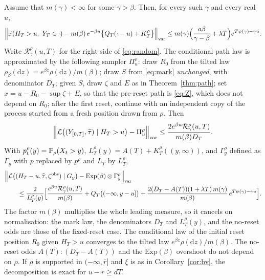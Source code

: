 \documentclass[11pt,a4paper]{article}
\begin{document}
\begin{theorem}\label{thm:random}
Assume that $m(\gamma)<\infty$ for some $\gamma>\beta$. Then, for every such $\gamma$ and every real $u$,
\begin{equation}\label{eq:random}
 \Big\|\mathbb P(H_T>u,\ Y_T\in\cdot)-m(\beta)\,e^{-\beta u}\big\{Q_T(\cdot-u)+K^\rho_T\big\}\Big\|_{\mathrm{var}}\le m(\gamma)\Big(\frac{a\beta}{\gamma-\beta}+\lambda T\Big)e^{T\psi(\gamma)-\gamma u}.
\end{equation}
Write $\mathcal R^\rho_\gamma(u,T)$ for the right side of \eqref{eq:random}. The conditional path law is approximated by the following sampler $\Pi^\rho_u$: draw $R_0$ from the tilted law $\rho_\beta(\mathrm dz)=e^{\beta z}\rho(\mathrm dz)/m(\beta)$; draw $S$ from \eqref{eq:mark} \emph{unchanged}, with denominator $D_T$; given $S$, draw $\zeta$ and $E$ as in Theorem~\ref{thm:path}; set $x=u-R_0-\sup\zeta+E$, so that the pre-reset path is \eqref{eq:Z}, which does not depend on $R_0$; after the first reset, continue with an independent copy of the process started from a fresh position drawn from $\rho$. Then
\begin{equation}\label{eq:randompath}
 \Big\|\mathcal L\big((Y_{[0,T]},\widehat\tau)\mid H_T>u\big)-\Pi^\rho_u\Big\|_{\mathrm{var}}\le\frac{2e^{\beta u}\mathcal R^\rho_\gamma(u,T)}{m(\beta)D_T}.
\end{equation}
With $p^\rho_t(y)=\mathbb P_\rho(X_t>y)$, $L^\rho_T(y)=A(T)+K^\rho_T((y,\infty))$, and $\Gamma^\rho_y$ defined as $\Gamma_y$ with $p$ replaced by $p^\rho$ and $L_T$ by $L^\rho_T$,
\begin{equation}\label{eq:randommarks}
 \begin{split}
 &\Big\|\mathcal L\big((H_T-u,\widehat\tau,\zeta^{\rm obs})\mid G_y\big)-\mathrm{Exp}(\beta)\otimes\Gamma^\rho_y\Big\|_{\mathrm{var}}\\
 &\qquad\le\frac{2}{L^\rho_T(y)}\Big[\frac{e^{\beta u}\mathcal R^\rho_\gamma(u,T)}{m(\beta)}+Q_T\big((-\infty,y-u]\big)+\frac{2(D_T-A(T))(1+\lambda T)\,m(\gamma)}{m(\beta)}\,e^{T\psi(\gamma)-\gamma u}\Big].
 \end{split}
\end{equation}
The factor $m(\beta)$ multiplies the whole leading measure, so it cancels on normalisation: the mark law, the denominators $D_T$ and $L^\rho_T(y)$, and the no-reset odds are those of the fixed-reset case. The conditional law of the initial reset position $R_0$ given $H_T>u$ converges to the tilted law $e^{\beta z}\rho(\mathrm dz)/m(\beta)$. The no-reset odds $A(T):(D_T-A(T))$ and the $\mathrm{Exp}(\beta)$ overshoot do not depend on $\rho$. If $\rho$ is supported in $(-\infty,\bar r]$ and $\xi$ is as in Corollary~\ref{cor:bv}, the decomposition is exact for $u-\bar r\ge dT$.
\end{theorem}
\end{document}
